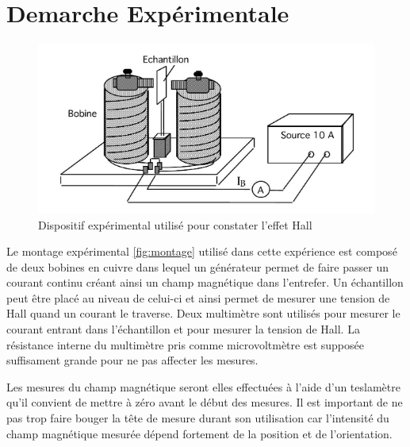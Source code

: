 \section{Demarche Expérimentale}


\begin{minipage}{\textwidth}
    \begin{figure}
        \centering
        \includegraphics[width=\linewidth]{figures/montage.png}
        \caption{Dispositif expérimental utilisé pour constater l'effet Hall \cite{notice}}
        \label{fig:montage}
        \vspace*{1cm}
    \end{figure}

    Le montage expérimental \autoref{fig:montage} utilisé dans cette expérience est composé de deux bobines en cuivre dans lequel un générateur permet de faire passer un courant continu créant ainsi un champ magnétique dans l'entrefer. Un échantillon peut être placé au niveau de celui-ci et ainsi permet de mesurer une tension de Hall quand un courant le traverse. Deux multimètre sont utilisés pour mesurer le courant entrant dans l'échantillon et pour mesurer la tension de Hall. La résistance interne du multimètre pris comme microvoltmètre est supposée suffisament grande pour ne pas affecter les mesures.
\end{minipage}

Les mesures du champ magnétique seront elles effectuées à l'aide d'un teslamètre qu'il convient de mettre à zéro avant le début des mesures. Il est important de ne pas trop faire bouger la tête de mesure durant son utilisation car l'intensité du champ magnétique mesurée dépend fortement de la position et de l'orientation.

